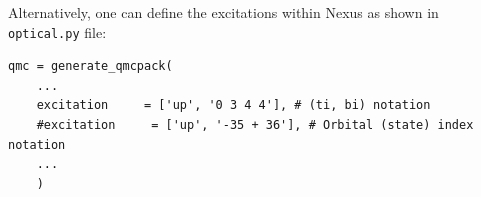 Alternatively, one can define the excitations within Nexus as shown in \texttt{optical.py} file:
\begin{lstlisting}
qmc = generate_qmcpack(
    ...
    excitation     = ['up', '0 3 4 4'], # (ti, bi) notation
    #excitation     = ['up', '-35 + 36'], # Orbital (state) index notation
    ...
    )
\end{lstlisting}

